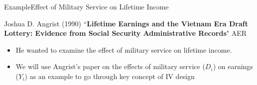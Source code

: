 \documentclass[dvipsnames,hyperref={pdfpagelabels=false}]{beamer}
\begin{document}
\date
{}


\begin{frame}{}
	\titlepage
\end{frame}





\begin{frame}{Example}{Effect of Military Service on Lifetime Income}
	
	
Joshua D. Angrist (1990) ``\textbf{Lifetime Earnings and the Vietnam Era Draft Lottery: Evidence from Social Security Administrative Records}" AER
	
	
	\begin{itemize}
		\item He wanted to examine the effect of military service on lifetime income.	
		\vspace{0.2cm}	
		\item We will use Angrist's paper on the effects of military service ($D_{i}$) on earnings ($Y_{i}$) as an example to go through key concept of IV design
		
		
	\end{itemize}
\end{frame}
\end{document}
